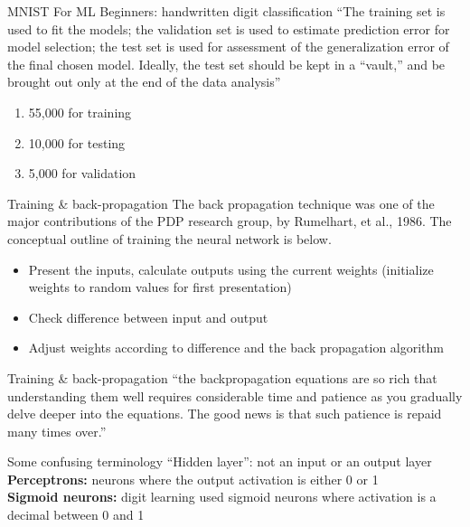 \documentclass{beamer}
\begin{document}
\begin{frame}{MNIST For ML Beginners: handwritten digit classification}
    ``The training set is used to fit the models; the validation set is used to estimate prediction error for model selection; the test set is used for assessment of the generalization error of the final chosen model. Ideally, the test set should be kept in a “vault,” and be brought out only at the end of the data analysis''


    \begin{enumerate}
        \item 55,000 for training
        \item 10,000 for testing
        \item 5,000 for validation
    \end{enumerate}
\end{frame}

\begin{frame}{Training \& back-propagation}
    The back propagation technique was one of the major contributions of the
    PDP research group, by Rumelhart, et al., 1986. The conceptual outline of
    training the neural network is below.


    \begin{itemize}
        \item Present the inputs, calculate outputs using the current weights (initialize weights to random values for first presentation)
        \item Check difference between input and output
        \item Adjust weights according to difference and the back propagation algorithm
    \end{itemize}

\end{frame}

\begin{frame}{Training \& back-propagation}
``the backpropagation equations are so rich that understanding them well requires considerable time and patience as you gradually delve deeper into the equations. The good news is that such patience is repaid many times over.''
\end{frame}

\begin{frame}{Some confusing terminology}
    ``Hidden layer'': not an input or an output layer
\\
    \textbf{Perceptrons:} neurons where the output activation is either 0 or 1
\\
    \textbf{Sigmoid neurons:} digit learning used sigmoid neurons
        where activation is a decimal between 0 and 1
\end{frame}
\end{document}
